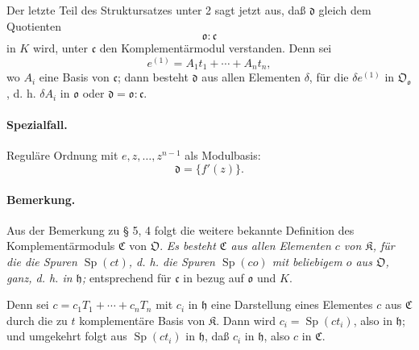 Der letzte Teil des Struktursatzes unter 2 sagt jetzt aus, daß $\mathfrak d$ gleich dem Quotienten
\[
\mathfrak o:\mathfrak c
\]
in $K$ wird, unter $\mathfrak c$ den Komplementärmodul verstanden. Denn sei
\[
e^{(1)}=A_1t_1+\cdots+A_nt_n,
\]
wo $A_i$ eine Basis von $\mathfrak c$; dann besteht $\mathfrak d$ aus allen Elementen $\delta$, für die $\delta e^{(1)}$ in $\mathfrak O_{\mathfrak o}$, d. h. $\delta A_i$ in $\mathfrak o$ oder $\mathfrak d=\mathfrak o:\mathfrak c$.

\paragraph{Spezialfall.}
Reguläre Ordnung mit $e,z,\ldots,z^{n-1}$ als Modulbasis:
\[
\mathfrak d=\{f'(z)\}.
\]

\paragraph{Bemerkung.}
Aus der Bemerkung zu § 5, 4 folgt die weitere bekannte Definition des Komplementärmoduls $\mathfrak C$ von $\mathfrak O$. \emph{Es besteht $\mathfrak C$ aus allen Elementen $c$ von $\mathfrak K$, für die die Spuren $\operatorname{Sp}(ct)$, d. h. die Spuren $\operatorname{Sp}(co)$ mit beliebigem $o$ aus $\mathfrak O$, ganz, d. h. in $\mathfrak h$;} entsprechend für $\mathfrak c$ in bezug auf $\mathfrak o$ und $K$.

Denn sei $c=c_1T_1+\cdots+c_nT_n$ mit $c_i$ in $\mathfrak h$ eine Darstellung eines Elementes $c$ aus $\mathfrak C$ durch die zu $t$ komplementäre Basis von $\mathfrak K$. Dann wird $c_i=\operatorname{Sp}(ct_i)$, also in $\mathfrak h$; und umgekehrt folgt aus $\operatorname{Sp}(ct_i)$ in $\mathfrak h$, daß $c_i$ in $\mathfrak h$, also $c$ in $\mathfrak C$.

